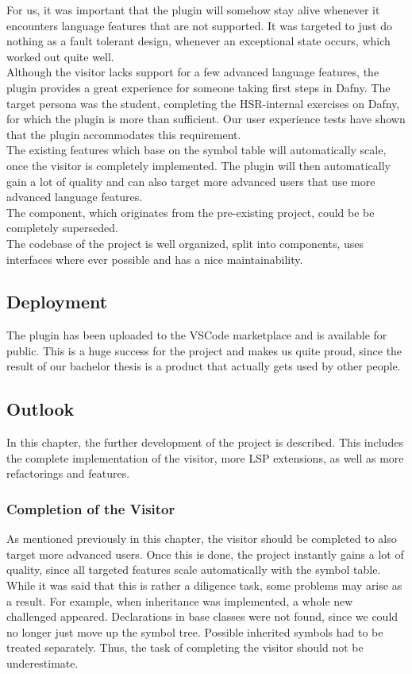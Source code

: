 For us, it was important that the plugin will somehow stay alive whenever it encounters language features that are not supported.
It was targeted to just do nothing as a fault tolerant design, whenever an exceptional state occurs, which worked out quite well.\\

Although the visitor lacks support for a few advanced language features, the plugin provides a great experience for someone taking first steps in Dafny.
The target persona was the student, completing the HSR-internal exercises on Dafny, for which the plugin is more than sufficient.
Our user experience tests have shown that the plugin accommodates this requirement.\\

The existing features which base on the symbol table will automatically scale, once the visitor is completely implemented.
The plugin will then automatically gain a lot of quality and can also target more advanced users that use more advanced language features.\\

The  component, which originates from the pre-existing project, could be be completely superseded.\\

The codebase of the project is well organized, split into components, uses interfaces where ever possible and has a nice maintainability.

\subsection{Deployment}
The plugin has been uploaded to the VSCode marketplace and is available for public.
This is a huge success for the project and makes us quite proud, since the result of our
bachelor thesis is a product that actually gets used by other people.

\subsection{Outlook}
In this chapter, the further development of the project is described.
This includes the complete implementation of the visitor, more LSP extensions, as well as more refactorings and features.

\subsubsection{Completion of the Visitor}
As mentioned previously in this chapter, the visitor should be completed to also target more advanced users.
Once this is done, the project instantly gains a lot of quality, since all targeted features scale automatically with the symbol table.
While it was said that this is rather a diligence task, some problems may arise as a result.
For example, when inheritance was implemented, a whole new challenged appeared.
Declarations in base classes were not found, since we could no longer just move up the symbol tree.
Possible inherited symbols had to be treated separately.
Thus, the task of completing the visitor should not be underestimate.

